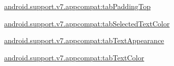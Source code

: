 {\ttfamily \hyperlink{classandroid_1_1support_1_1v7_1_1appcompat_1_1R_1_1styleable_aba4947a78faa7f4241585dfd200d7bd1}{android.\+support.\+v7.\+appcompat\+:tab\+Padding\+Top}}

{\ttfamily \hyperlink{classandroid_1_1support_1_1v7_1_1appcompat_1_1R_1_1styleable_a626aef8a758ebfe276a9f430c531fd6f}{android.\+support.\+v7.\+appcompat\+:tab\+Selected\+Text\+Color}}

{\ttfamily \hyperlink{classandroid_1_1support_1_1v7_1_1appcompat_1_1R_1_1styleable_a7ee7e0ba38afd5264e1ff4cd29c5d183}{android.\+support.\+v7.\+appcompat\+:tab\+Text\+Appearance}}

{\ttfamily \hyperlink{classandroid_1_1support_1_1v7_1_1appcompat_1_1R_1_1styleable_abad9974ac19ca4794058c4665a9bd530}{android.\+support.\+v7.\+appcompat\+:tab\+Text\+Color}}

